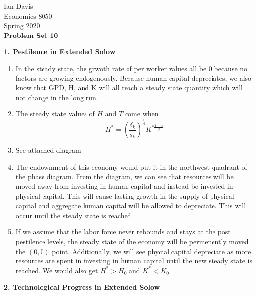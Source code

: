 \documentclass[11pt]{article}
\begin{document}

\begin{flushleft}
Ian Davis\\
Economics 8050\\
Spring 2020\\
\bigskip
\textbf{Problem Set 10}\\
\end{flushleft}
\textbf{1. Pestilence in Extended Solow}
\begin{enumerate}[label=\alph*]
    \item In the steady state, the grwoth rate of per worker values all be 0 because no factors are growing endogenously. Because human capital depreciates, we also know that GPD, H, and K will all reach a steady state quantity which will not change in the long run.
    \item The steady state values of $H$ and $T$ come when
    \begin{equation}
        H^* = (\frac{\delta_k}{s_k})^\frac{1}{\beta}K^{*\frac{1 - \alpha}{\beta}}
    \end{equation}
    \item See attached diagram
    \item The endownment of this economy would put it in the northwest quadrant of the phase diagram. From the diagram, we can see that resources will be moved away from investing in human capital and instead be invested in physical capital. This will cause lasting growth in the supply of physical capital and aggregate human capital will be allowed to depreciate. This will occur until the steady state is reached.
    \item If we assume that the labor force never rebounds and stays at the post pestilence levels, the steady state of the economy will be permenently moved the $(0,0)$ point. Additionally, we will see phycial capital depreciate as more resources are spent in investing in human capital until the new steady state is reached. We would also get $H^* > H_0$ and $K^* < K_0$
\end{enumerate}
\textbf{2. Technological Progress in Extended Solow}
\end{document}
